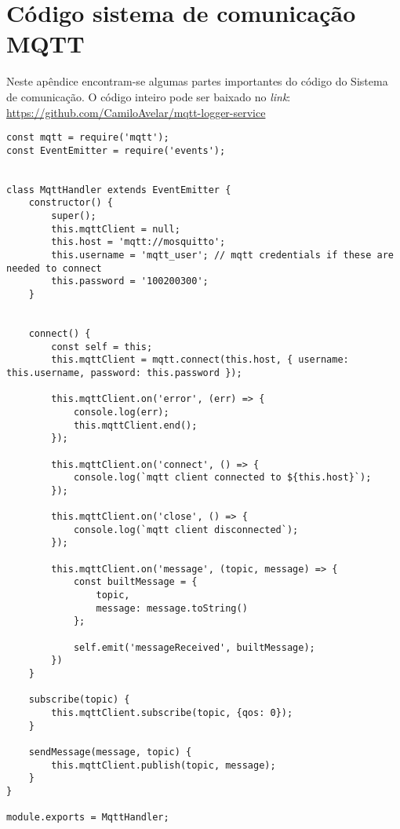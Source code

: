 \chapter{Código sistema de comunicação MQTT} \label{ap:mqtt}

Neste apêndice encontram-se algumas partes importantes do código do Sistema de comunicação. O código inteiro pode ser baixado no \textit{link}: \url{https://github.com/CamiloAvelar/mqtt-logger-service}

\begin{lstlisting}[caption=Exemplo do código de comunicação MQTT]
const mqtt = require('mqtt');
const EventEmitter = require('events');


class MqttHandler extends EventEmitter {
	constructor() {
		super();
		this.mqttClient = null;
		this.host = 'mqtt://mosquitto';
		this.username = 'mqtt_user'; // mqtt credentials if these are needed to connect
		this.password = '100200300';
	}
	
	
	connect() {
		const self = this;
		this.mqttClient = mqtt.connect(this.host, { username: this.username, password: this.password });
		
		this.mqttClient.on('error', (err) => {
			console.log(err);
			this.mqttClient.end();
		});
		
		this.mqttClient.on('connect', () => {
			console.log(`mqtt client connected to ${this.host}`);
		});
		
		this.mqttClient.on('close', () => {
			console.log(`mqtt client disconnected`);
		});
		
		this.mqttClient.on('message', (topic, message) => {
			const builtMessage = {
				topic,
				message: message.toString()
			};
		
			self.emit('messageReceived', builtMessage);
		})
	}
	
	subscribe(topic) {
		this.mqttClient.subscribe(topic, {qos: 0});
	}
	
	sendMessage(message, topic) {
		this.mqttClient.publish(topic, message);
	}
}

module.exports = MqttHandler;
\end{lstlisting}

